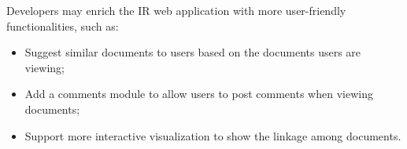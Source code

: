 Developers may enrich the IR web application with more user-friendly functionalities, such as:

\begin{itemize}
\item Suggest similar documents to users based on the documents users are viewing;
\item Add a comments module to allow users to post comments when viewing documents;
\item Support more interactive visualization to show the linkage among documents.
\end{itemize}
